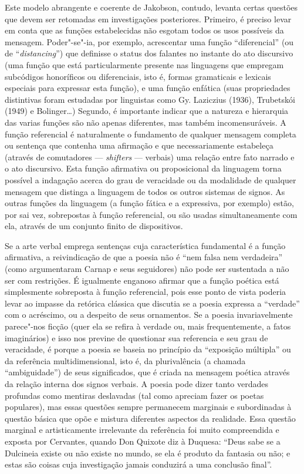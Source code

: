 Este modelo abrangente e coerente de Jakobson, contudo, levanta certas
questões que devem ser retomadas em investigações posteriores. Primeiro,
é preciso levar em conta que as funções estabelecidas não esgotam todos
os usos possíveis da mensagem. Poder"-se"-ia, por exemplo, acrescentar uma
função ``diferencial'' (ou de ``\emph{distancing}'') que definisse o
status dos falantes no instante do ato discursivo (uma função que está
particularmente presente nas linguagens que empregam subcódigos
honoríficos ou diferenciais, isto é, formas gramaticais e lexicais
especiais para expressar esta função), e uma função enfática (suas
propriedades distintivas foram estudadas por linguistas como Gy.
Laziczius (1936), Trubetskói (1949) e Bolinger\ldots{}) Segundo, é importante
indicar que a natureza e hierarquia das varias funções são não apenas
diferentes, mas também incomensuráveis. A função referencial é
naturalmente o fundamento de qualquer mensagem completa ou sentença que
contenha uma afirmação e que necessariamente estabeleça (através de
comutadores --- \emph{shifters} --- verbais) uma relação entre fato
narrado e o ato discursivo. Esta função afirmativa ou proposicional da
linguagem torna possível a indagação acerca do grau de veracidade ou da
modalidade de qualquer mensagem que distinga a linguagem de todos os
outros sistemas de signos. As outras funções da linguagem (a função
fática e a expressiva, por exemplo) estão, por sai vez, sobrepostas à
função referencial, ou são usadas simultaneamente com ela, através de um
conjunto finito de dispositivos.

Se a arte verbal emprega sentenças cuja característica fundamental é a
função afirmativa, a reivindicação de que a poesia não é ``nem falsa nem
verdadeira'' (como argumentaram Carnap e seus seguidores) não pode ser
sustentada a não ser com restrições. É igualmente enganoso afirmar que a
função poética está simplesmente sobreposta à função referencial, pois
esse ponto de vista poderia levar ao impasse da retórica clássica que
discutia se a poesia expressa a ``verdade'' com o acréscimo, ou a
despeito de seus ornamentos. Se a poesia invariavelmente parece"-nos
ficção (quer ela se refira à verdade ou, mais frequentemente, a fatos
imaginários) e isso nos previne de questionar sua referencia e seu grau
de veracidade, é porque a poesia se baseia no princípio da ``exposição
múltipla'' ou da referência multidimensional, isto é, da plurivalência
(a chamada ``ambiguidade'') de seus significados, que é criada na
mensagem poética através da relação interna dos signos verbais. A poesia
pode dizer tanto verdades profundas como mentiras deslavadas (tal como
apreciam fazer os poetas populares), mas essas questões sempre
permanecem marginais e subordinadas à questão básica que opõe e mistura
diferentes aspectos da realidade. Essa questão marginal e artisticamente
irrelevante da referência foi muito compreendida e exposta por
Cervantes, quando Don Quixote diz à Duquesa: ``Deus sabe se a Dulcineia
existe ou não existe no mundo, se ela é produto da fantasia ou não; e
estas são coisas cuja investigação jamais conduzirá a uma conclusão
final''.

